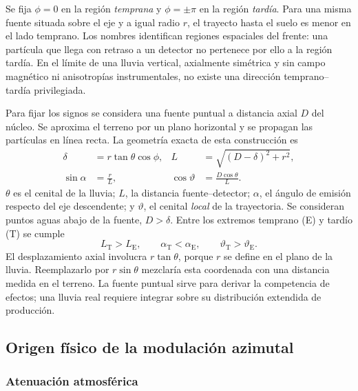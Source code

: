 Se fija $\phi=0$ en la región \textit{temprana} y $\phi=\pm\pi$ en la región \textit{tardía}. Para una misma fuente situada sobre el eje y a igual radio $r$, el trayecto hasta el suelo es menor en el lado temprano. Los nombres identifican regiones espaciales del frente: una partícula que llega con retraso a un detector no pertenece por ello a la región tardía. En el límite de una lluvia vertical, axialmente simétrica y sin campo magnético ni anisotropías instrumentales, no existe una dirección temprano--tardía privilegiada.

Para fijar los signos se considera una fuente puntual a distancia axial $D$ del núcleo. Se aproxima el terreno por un plano horizontal y se propagan las partículas en línea recta. La geometría exacta de esta construcción es
\begin{align}
\delta&=r\tan\theta\cos\phi,&
L&=\sqrt{(D-\delta)^2+r^2},\nonumber\\
\sin\alpha&=\frac{r}{L},&
\cos\vartheta&=\frac{D\cos\theta}{L}.
\label{eq:geometria_fuente_muonica}
\end{align}
$\theta$ es el cenital de la lluvia; $L$, la distancia fuente--detector; $\alpha$, el ángulo de emisión respecto del eje descendente; y $\vartheta$, el cenital \emph{local} de la trayectoria. Se consideran puntos aguas abajo de la fuente, $D>\delta$. Entre los extremos temprano (E) y tardío (T) se cumple
\begin{equation}
L_{\mathrm T}>L_{\mathrm E},\qquad
\alpha_{\mathrm T}<\alpha_{\mathrm E},\qquad
\vartheta_{\mathrm T}>\vartheta_{\mathrm E}.
\label{eq:fen2026:orden}
\end{equation}
El desplazamiento axial involucra $r\tan\theta$, porque $r$ se define en el plano de la lluvia. Reemplazarlo por $r\sin\theta$ mezclaría esta coordenada con una distancia medida en el terreno. La fuente puntual sirve para derivar la competencia de efectos; una lluvia real requiere integrar sobre su distribución extendida de producción.

\subsection{Origen físico de la modulación azimutal}
\label{subsec:origen_fisico}

\subsubsection{Atenuación atmosférica}
\label{subsubsec:atenuacion}

